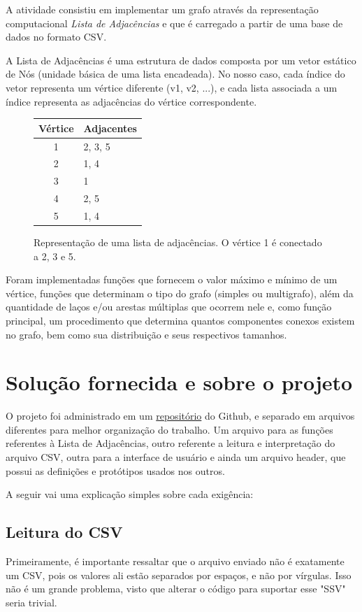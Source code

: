 \documentclass[a4paper, 12pt]{article}
\begin{document}
A atividade consistiu em implementar um grafo através da representação computacional
\textit{Lista de Adjacências} e que é carregado a partir de uma base de dados no
formato CSV.

A Lista de Adjacências é uma estrutura de dados composta por um vetor estático
de Nós (unidade básica de uma lista encadeada). No nosso caso, cada índice do
vetor representa um vértice diferente (v1, v2, ...), e cada lista associada a um
índice representa as adjacências do vértice correspondente.

\begin{figure}[h]
\centering
\begin{tabular}{c|l}
Vértice & Adjacentes \\ \hline
1 & 2, 3, 5 \\
2 & 1, 4 \\
3 & 1 \\
4 & 2, 5 \\
5 & 1, 4 \\
\end{tabular}
\caption{Representação de uma lista de adjacências. O vértice 1 é
conectado a 2, 3 e 5.}
\end{figure}

Foram implementadas funções que fornecem o valor máximo e mínimo de um vértice,
funções que determinam o tipo do grafo (simples ou multigrafo), além da quantidade
de laços e/ou arestas múltiplas que ocorrem nele e, como função principal, um
procedimento que determina quantos componentes conexos existem no grafo, bem como
sua distribuição e seus respectivos tamanhos.
\newpage
\section{Solução fornecida e sobre o projeto}

O projeto foi administrado em um \href{https://github.com/atomicpenguinz/TEG_1}{repositório}
do Github, e separado em arquivos diferentes para melhor organização do trabalho.
Um arquivo para as funções referentes à Lista de Adjacências, outro referente
a leitura e interpretação do arquivo CSV, outra para a interface de usuário e ainda
um arquivo header, que possui as definições e protótipos usados nos outros.

A seguir vai uma explicação simples sobre cada exigência:

\subsection{Leitura do CSV}
Primeiramente, é importante ressaltar que o arquivo enviado não é exatamente um
CSV, pois os valores ali estão separados por espaços, e não por vírgulas. Isso
não é um grande problema, visto que alterar o código para suportar esse "SSV"
seria trivial.
\end{document}
